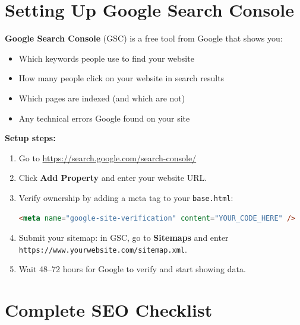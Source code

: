 \documentclass[12pt, a4paper]{book}
\begin{document}
\section{Setting Up Google Search Console}

\textbf{Google Search Console} (GSC) is a free tool from Google that shows you:
\begin{itemize}[leftmargin=1.5em]
  \item Which keywords people use to find your website
  \item How many people click on your website in search results
  \item Which pages are indexed (and which are not)
  \item Any technical errors Google found on your site
\end{itemize}

\textbf{Setup steps:}
\begin{enumerate}[leftmargin=1.5em]
  \item Go to \url{https://search.google.com/search-console/}
  \item Click \textbf{Add Property} and enter your website URL.
  \item Verify ownership by adding a meta tag to your \texttt{base.html}:
    \begin{lstlisting}[language=html, style=bashstyle]
<meta name="google-site-verification" content="YOUR_CODE_HERE" />
    \end{lstlisting}
  \item Submit your sitemap: in GSC, go to \textbf{Sitemaps} and enter
        \texttt{https://www.yourwebsite.com/sitemap.xml}.
  \item Wait 48--72 hours for Google to verify and start showing data.
\end{enumerate}

\section{Complete SEO Checklist}
\end{document}
